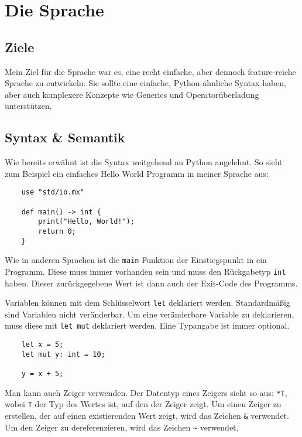 \section{Die Sprache}

    \subsection{Ziele}
        Mein Ziel für die Sprache war es, eine recht einfache, aber dennoch feature-reiche Sprache
        zu entwickeln. Sie sollte eine einfache, Python-ähnliche Syntax haben, aber auch
        komplexere Konzepte wie Generics und Operatorüberladung unterstützen.
    \subsection{Syntax \& Semantik}
        Wie bereits erwähnt ist die Syntax weitgehend an Python angelehnt. So sieht zum Beispiel ein einfaches
        Hello World Programm in meiner Sprache aus:

        \begin{lstlisting}
    use "std/io.mx"

    def main() -> int {
        print("Hello, World!");
        return 0;
    }
        \end{lstlisting}

        Wie in anderen Sprachen ist die \texttt{main} Funktion der Einstiegspunkt in ein Programm.
        Diese muss immer vorhanden sein und muss den Rückgabetyp \texttt{int} haben. Dieser zurückgegebene Wert ist dann
        auch der Exit-Code des Programms.

        Variablen können mit dem Schlüsselwort \texttt{let} deklariert werden. Standardmäßig sind Variablen
        nicht veränderbar. Um eine veränderbare Variable zu deklarieren, muss diese mit \texttt{let mut} deklariert
        werden. Eine Typangabe ist immer optional.
        \begin{lstlisting}
    let x = 5;
    let mut y: int = 10;

    y = x + 5;
        \end{lstlisting}

        \newpage
        Man kann auch Zeiger verwenden. Der Datentyp eines Zeigers sieht so aus: \texttt{*T}, wobei \texttt{T} der Typ des Wertes ist, 
        auf den der Zeiger zeigt.
        Um einen Zeiger zu erstellen, der auf einen existierenden Wert zeigt, wird das Zeichen \texttt{\&} verwendet.
        Um den Zeiger zu dereferenzieren, wird das Zeichen \texttt{\~} verwendet.


